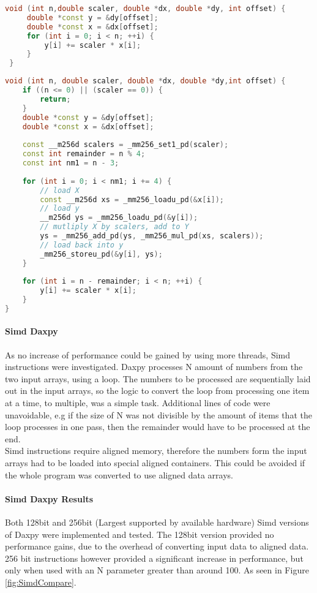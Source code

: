 \documentclass[conference]{acmsiggraph}
\begin{document}
 \begin{lstlisting}[language=C++,caption={daxpy Code},label=daxpyCode]
 void (int n,double scaler, double *dx, double *dy, int offset) {
	 double *const y = &dy[offset];
	 double *const x = &dx[offset];
	 for (int i = 0; i < n; ++i) {
		 y[i] += scaler * x[i];
	 }
 }
\end{lstlisting}
 
\begin{lstlisting}[language=C++,caption={Simd daxpy Code},label=SimdDaxpyCode]
void (int n, double scaler, double *dx, double *dy,int offset) {
	if ((n <= 0) || (scaler == 0)) {
		return;
	}
	double *const y = &dy[offset];
	double *const x = &dx[offset];
	
	const __m256d scalers = _mm256_set1_pd(scaler);
	const int remainder = n % 4;
	const int nm1 = n - 3;
	
	for (int i = 0; i < nm1; i += 4) {
		// load X
		const __m256d xs = _mm256_loadu_pd(&x[i]);
		// load y
		__m256d ys = _mm256_loadu_pd(&y[i]);
		// mutliply X by scalers, add to Y
		ys = _mm256_add_pd(ys, _mm256_mul_pd(xs, scalers));
		// load back into y
		_mm256_storeu_pd(&y[i], ys);
	}
	
	for (int i = n - remainder; i < n; ++i) {
		y[i] += scaler * x[i];
	}
}
\end{lstlisting}

\paragraph{Simd Daxpy}
As no increase of performance could be gained by using more threads, Simd instructions were investigated.
Daxpy processes N amount of numbers from the two input arrays, using a loop. 
The numbers to be processed are sequentially laid out in the input arrays, so the logic to convert the loop from processing one item at a time, to multiple, was a simple task.
Additional lines of code were unavoidable, e.g if the size of N was not divisible by the amount of items that the loop processes in one pass, then the remainder would have to be processed at the end.
\\
Simd instructions require aligned memory, therefore the numbers form the input arrays had to be loaded into special aligned containers. 
This could be avoided if the whole program was converted to use aligned data arrays.

\paragraph{Simd Daxpy Results}
Both 128bit and 256bit (Largest supported by available hardware) Simd versions of Daxpy were implemented and tested.
The 128bit version provided no performance gains, due to the overhead of converting input data to aligned data.
256 bit instructions however provided a significant increase in performance, but only when used with an N parameter greater than around 100. As seen in Figure \ref{fig:SimdCompare}.
\end{document}
